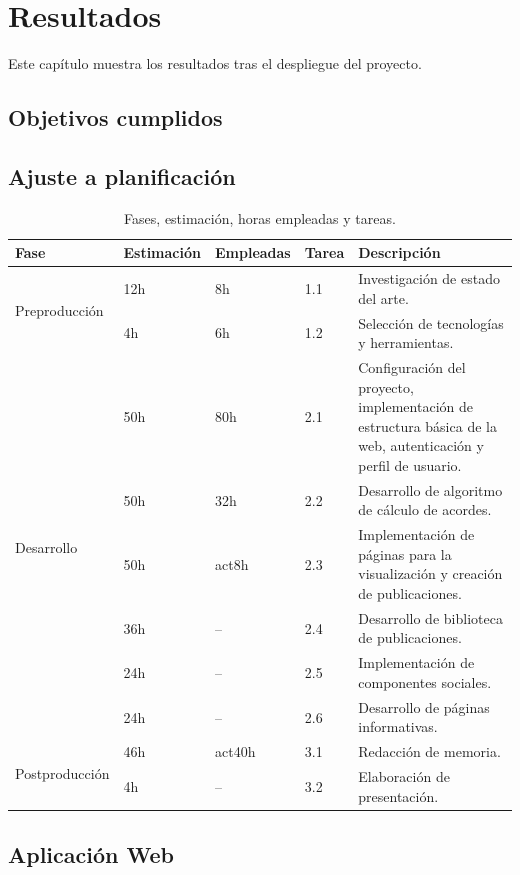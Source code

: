 \chapter{Resultados}
Este capítulo muestra los resultados tras el despliegue del proyecto.
\section{Objetivos cumplidos}

\section{Ajuste a planificación}

\begin{table}[H]
    \caption{Fases, estimación, horas empleadas y tareas.}\label{tab:fases_tareas_ajuste}
    \scriptsize
    \centering
    \begin{tabular}{lll lp{}}
        \hline

        \textbf{Fase} & \textbf{Estimación} & \textbf{Empleadas} & \textbf{Tarea} & \textbf{Descripción} \\ \hline
        
        \multirow{2}{*}{Preproducción} 
        & 12h & 8h & 1.1 & Investigación de estado del arte. \\ 
        & 4h & 6h & 1.2 & Selección de tecnologías y herramientas. \\ \hline
        
        \multirow{6}{*}{Desarrollo} 
        & 50h & 80h & 2.1 & Configuración del proyecto, implementación de estructura básica de la web, autenticación y perfil de usuario. \\ 
        & 50h & 32h & 2.2 & Desarrollo de algoritmo de cálculo de acordes. \\ 
        & 50h & act8h & 2.3 & Implementación de páginas para la visualización y creación de publicaciones. \\ 
        & 36h & -- & 2.4 & Desarrollo de biblioteca de publicaciones. \\ 
        & 24h & -- & 2.5 & Implementación de componentes sociales. \\ 
        & 24h & -- & 2.6 & Desarrollo de páginas informativas. \\ \hline
        
        \multirow{2}{*}{Postproducción} 
        & 46h & act40h & 3.1 & Redacción de memoria. \\ 
        & 4h & -- & 3.2 & Elaboración de presentación. \\ \hline
        
    \end{tabular}
\end{table}

\section{Aplicación Web}